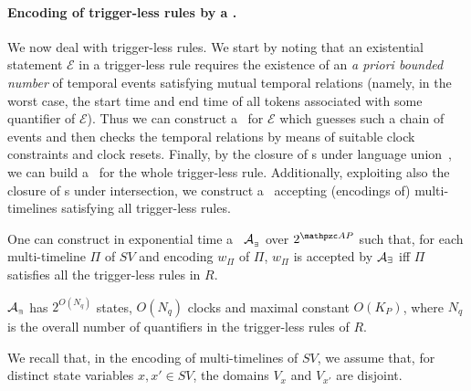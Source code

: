 \paragraph{Encoding of trigger-less rules by a \TA.} 
We now deal with trigger-less rules.
We start by noting that an existential statement $\mathcal{E}$ in a trigger-less rule requires
the existence of an \emph{a priori bounded number} of temporal events satisfying mutual temporal relations (namely, in the worst case, the start time and end time of all tokens associated with some quantifier of $\mathcal{E}$). Thus we can construct a \TA\ for $\mathcal{E}$
which guesses such a chain of events and then checks the temporal relations by means of suitable clock constraints and clock resets.
Finally, by the closure of \TA s under language union~\cite{ALUR1994183}, we can build a \TA\ for the whole trigger-less rule. Additionally, exploiting also the closure of \TA s under intersection, we construct a \TA\ accepting (encodings of) multi-timelines satisfying all trigger-less rules.%

 \begin{proposition}\label{prop:TATriggerLessRules} One can construct in exponential time a \TA\ $\mathcal{A}_{_\exists}$ over $2^{\Prop}$  such that, for each multi-timeline $\Pi$ of $SV$ and encoding $w_\Pi$ of $\Pi$, $w_\Pi$ is accepted by $\mathcal{A}_{\exists}$
  iff $\Pi$ satisfies all the  trigger-less  rules in $R$. 
  
  $\mathcal{A}_{_\exists}$ has  $2^{O(N_q)}$ states, $O(N_q)$ clocks and maximal constant $O(K_P)$, where
  $N_q$  is the overall number of quantifiers   in the trigger-less  rules of $R$.
 \end{proposition}
 
 We recall that, in the encoding of multi-timelines of $SV$, we assume that, for distinct state variables $x,x'\in SV$, the domains $V_x$ and  $V_{x'}$
are disjoint.

